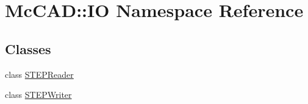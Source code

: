 \hypertarget{namespaceMcCAD_1_1IO}{}\section{Mc\+C\+AD\+:\+:IO Namespace Reference}
\label{namespaceMcCAD_1_1IO}
\subsection*{Classes}
\begin{DoxyCompactItemize}
\item 
class \hyperlink{classMcCAD_1_1IO_1_1STEPReader}{S\+T\+E\+P\+Reader}
\item 
class \hyperlink{classMcCAD_1_1IO_1_1STEPWriter}{S\+T\+E\+P\+Writer}
\end{DoxyCompactItemize}
